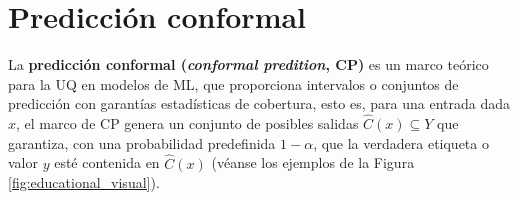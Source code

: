     

















\section{Predicción conformal}

La \textbf{predicción conformal (\textit{conformal predition}, CP)} \cite{vovk2005, angelopoulos2021} es un 
marco teórico para la UQ en modelos de ML, que proporciona intervalos o conjuntos de predicción con garantías 
estadísticas de cobertura, esto es, para una entrada dada $x$, el marco de CP genera un conjunto de posibles 
salidas $\hat{C}(x) \subseteq Y$ que garantiza, con una probabilidad predefinida $1-\alpha$, que la verdadera 
etiqueta o valor $y$ esté contenida en $\hat{C}(x)$ (véanse los ejemplos de la Figura 
\ref{fig:educational_visual}).


